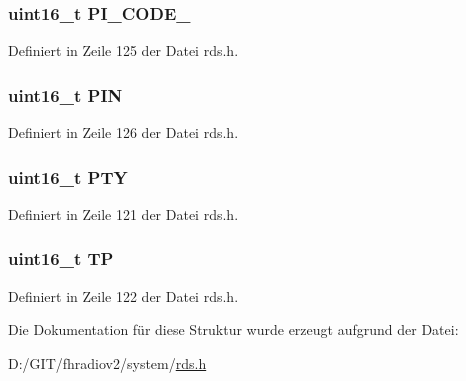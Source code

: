 \subsubsection[{P\+I\+\_\+\+C\+O\+D\+E\+\_\+2}]{\setlength{\rightskip}{0pt plus 5cm}uint16\+\_\+t P\+I\+\_\+\+C\+O\+D\+E\+\_}\label{structgroup__1b_ae86fed9d07832a5c3cc36d5aaa064bcb}


Definiert in Zeile 125 der Datei rds.\+h.

\hypertarget{structgroup__1b_a23b9db30b873d9b45f435df66328a784}{}
\subsubsection[{P\+I\+N}]{\setlength{\rightskip}{0pt plus 5cm}uint16\+\_\+t P\+I\+N}\label{structgroup__1b_a23b9db30b873d9b45f435df66328a784}


Definiert in Zeile 126 der Datei rds.\+h.

\hypertarget{structgroup__1b_a0474967478fbbc2c71b800d2e0132d45}{}
\subsubsection[{P\+T\+Y}]{\setlength{\rightskip}{0pt plus 5cm}uint16\+\_\+t P\+T\+Y}\label{structgroup__1b_a0474967478fbbc2c71b800d2e0132d45}


Definiert in Zeile 121 der Datei rds.\+h.

\hypertarget{structgroup__1b_ab9e634c63b0d95a96716d5f6d7f06d72}{}
\subsubsection[{T\+P}]{\setlength{\rightskip}{0pt plus 5cm}uint16\+\_\+t T\+P}\label{structgroup__1b_ab9e634c63b0d95a96716d5f6d7f06d72}


Definiert in Zeile 122 der Datei rds.\+h.



Die Dokumentation für diese Struktur wurde erzeugt aufgrund der Datei\+:\begin{DoxyCompactItemize}
\item 
D\+:/\+G\+I\+T/fhradiov2/system/\hyperlink{rds_8h}{rds.\+h}\end{DoxyCompactItemize}
